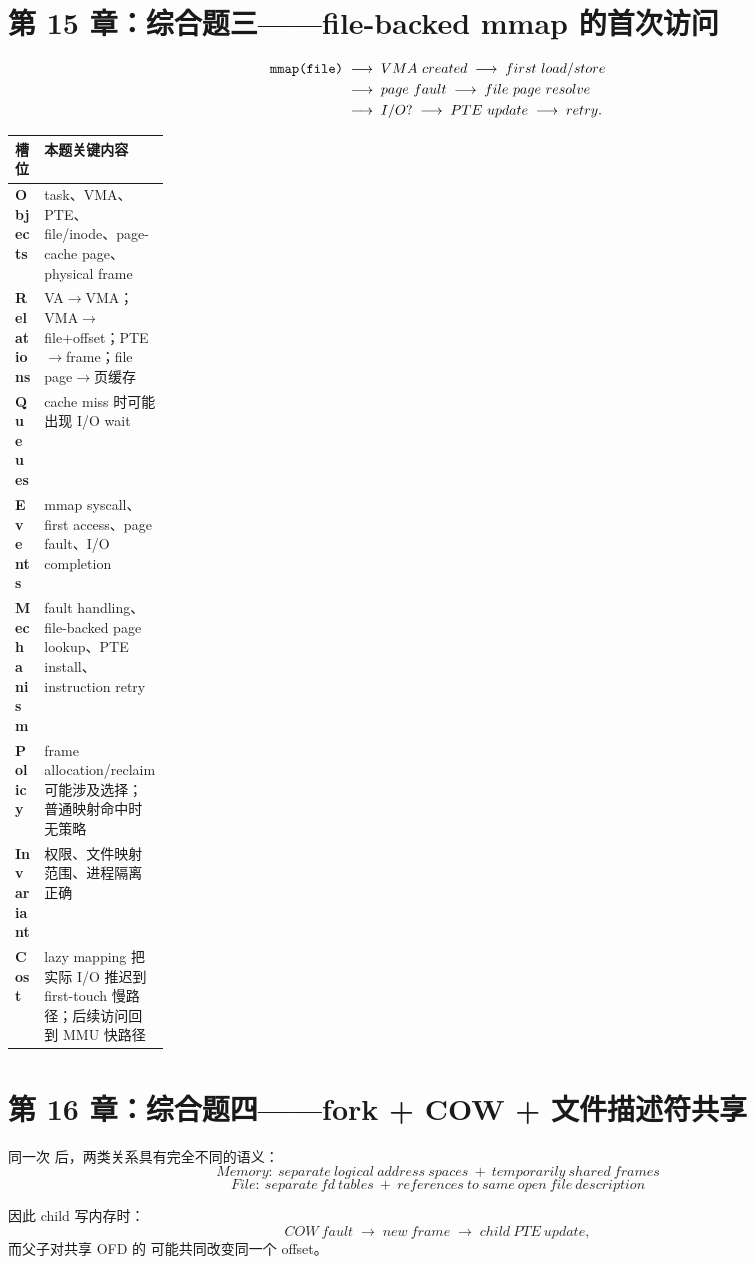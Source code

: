 \documentclass[11pt,a4paper]{ctexart}
\newcommand{\code}[1]{\texttt{\detokenize{#1}}}
\newcommand{\arr}{\;\longrightarrow\;}
\begin{document}
\section{第 15 章：综合题三——file-backed mmap 的首次访问}

\[
\begin{aligned}
\code{mmap(file)}&\arr VMA\ created\arr first\ load/store\\
&\arr page\ fault\arr file\ page\ resolve\\
&\arr I/O?\arr PTE\ update\arr retry.
\end{aligned}
\]

\begin{center}
\small
\renewcommand{\arraystretch}{1.25}
\begin{tabularx}{\linewidth}{>{\bfseries}p{0.18\linewidth} X}
\toprule
槽位 & 本题关键内容 \\
\midrule
Objects & task、VMA、PTE、file/inode、page-cache page、physical frame \\
Relations & VA$\to$VMA；VMA$\to$file+offset；PTE$\to$frame；file page$\to$页缓存 \\
Queues & cache miss 时可能出现 I/O wait \\
Events & mmap syscall、first access、page fault、I/O completion \\
Mechanism & fault handling、file-backed page lookup、PTE install、instruction retry \\
Policy & frame allocation/reclaim 可能涉及选择；普通映射命中时无策略 \\
Invariant & 权限、文件映射范围、进程隔离正确 \\
Cost & lazy mapping 把实际 I/O 推迟到 first-touch 慢路径；后续访问回到 MMU 快路径 \\
\bottomrule
\end{tabularx}
\end{center}

\section{第 16 章：综合题四——fork + COW + 文件描述符共享}

同一次 \code{fork()} 后，两类关系具有完全不同的语义：
\[
\boxed{Memory:\ separate\ logical\ address\ spaces\ +\ temporarily\ shared\ frames}
\]
\[
\boxed{File:\ separate\ fd\ tables\ +\ references\ to\ same\ open\ file\ description}
\]

因此 child 写内存时：
\[
COW\ fault\arr new\ frame\arr child\ PTE\ update,
\]
而父子对共享 OFD 的 \code{read/lseek} 可能共同改变同一个 offset。
\end{document}

